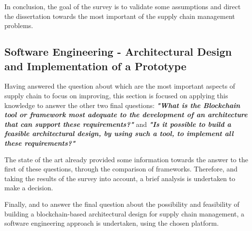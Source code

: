 In conclusion, the goal of the survey is to validate some assumptions and direct the dissertation towards the most important  of the supply chain management problems.

\subsection{Software Engineering - Architectural Design and Implementation of a Prototype}

Having answered the question about which are the most important aspects of supply chain to focus on improving, this section is focused on applying this knowledge to answer the other two final questions: \textbf{\textit{"What is the Blockchain tool or framework most adequate to the development of an architecture that can support these requirements?"}} and 
\textbf{\textit{"Is it possible to build a feasible architectural design, by using such a tool, to implement all these requirements?"}}


The state of the art already provided some information towards the answer to the first of these questions, through the comparison of frameworks. Therefore, and taking the results of the survey into account, a brief analysis is undertaken to make a decision.


Finally, and to answer the final question about the possibility and feasibility of building a blockchain-based architectural design for supply chain management, a software engineering approach is undertaken, using the chosen platform. 


